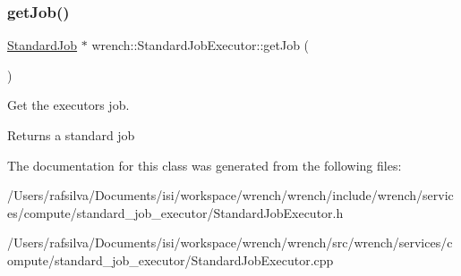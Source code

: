 \subsubsection{\texorpdfstring{get\+Job()}{getJob()}}
{\footnotesize\ttfamily \hyperlink{classwrench_1_1_standard_job}{Standard\+Job} $\ast$ wrench\+::\+Standard\+Job\+Executor\+::get\+Job (\begin{DoxyParamCaption}{ }\end{DoxyParamCaption})}



Get the executor\textquotesingle{}s job. 

\begin{DoxyReturn}{Returns}
a standard job 
\end{DoxyReturn}


The documentation for this class was generated from the following files\+:\begin{DoxyCompactItemize}
\item 
/\+Users/rafsilva/\+Documents/isi/workspace/wrench/wrench/include/wrench/services/compute/standard\+\_\+job\+\_\+executor/Standard\+Job\+Executor.\+h\item 
/\+Users/rafsilva/\+Documents/isi/workspace/wrench/wrench/src/wrench/services/compute/standard\+\_\+job\+\_\+executor/Standard\+Job\+Executor.\+cpp\end{DoxyCompactItemize}
